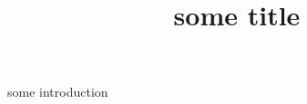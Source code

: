 \documentclass{report}
\title{some title}
\newcounter{mypage}
\begin{document}
some introduction
\begin{abstract}
  \thispagestyle{plain}
  \lipsum[1]
\end{abstract}
\lipsum[2]
\end{document}

